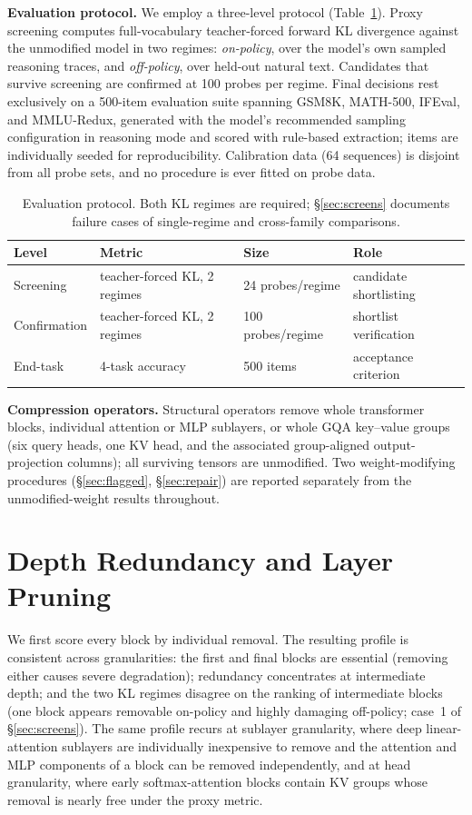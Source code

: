 \documentclass[10pt]{article}
\begin{document}
\textbf{Evaluation protocol.} We employ a three-level protocol (Table~\ref{tab:ladder}). Proxy screening computes full-vocabulary teacher-forced forward KL divergence against the unmodified model in two regimes: \emph{on-policy}, over the model's own sampled reasoning traces, and \emph{off-policy}, over held-out natural text. Candidates that survive screening are confirmed at 100 probes per regime. Final decisions rest exclusively on a 500-item evaluation suite spanning GSM8K, MATH-500, IFEval, and MMLU-Redux, generated with the model's recommended sampling configuration in reasoning mode and scored with rule-based extraction; items are individually seeded for reproducibility. Calibration data (64 sequences) is disjoint from all probe sets, and no procedure is ever fitted on probe data.

\begin{table}[h]
\centering\small
\begin{tabular}{llll}
\toprule
Level & Metric & Size & Role \\
\midrule
Screening & teacher-forced KL, 2 regimes & 24 probes/regime & candidate shortlisting \\
Confirmation & teacher-forced KL, 2 regimes & 100 probes/regime & shortlist verification \\
End-task & 4-task accuracy & 500 items & acceptance criterion \\
\bottomrule
\end{tabular}
\caption{Evaluation protocol. Both KL regimes are required; \S\ref{sec:screens} documents failure cases of single-regime and cross-family comparisons.}
\label{tab:ladder}
\end{table}

\textbf{Compression operators.} Structural operators remove whole transformer blocks, individual attention or MLP sublayers, or whole GQA key--value groups (six query heads, one KV head, and the associated group-aligned output-projection columns); all surviving tensors are unmodified. Two weight-modifying procedures (\S\ref{sec:flagged}, \S\ref{sec:repair}) are reported separately from the unmodified-weight results throughout.

\section{Depth Redundancy and Layer Pruning}
\label{sec:map}
We first score every block by individual removal. The resulting profile is consistent across granularities: the first and final blocks are essential (removing either causes severe degradation); redundancy concentrates at intermediate depth; and the two KL regimes disagree on the ranking of intermediate blocks (one block appears removable on-policy and highly damaging off-policy; case~1 of \S\ref{sec:screens}). The same profile recurs at sublayer granularity, where deep linear-attention sublayers are individually inexpensive to remove and the attention and MLP components of a block can be removed independently, and at head granularity, where early softmax-attention blocks contain KV groups whose removal is nearly free under the proxy metric.
\end{document}
